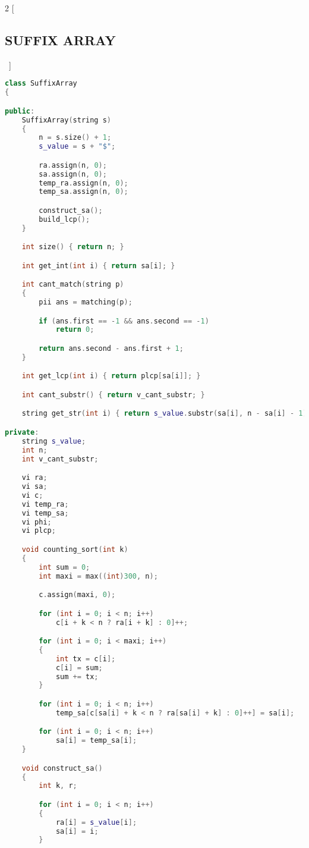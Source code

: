 \documentclass[leter]{amsart}
\begin{document}
\begin{multicols}{2}
[\subsection{SUFFIX ARRAY}\ ]
\begin{lstlisting}[language=C++]
class SuffixArray
{

public:
    SuffixArray(string s)
    {
        n = s.size() + 1;
        s_value = s + "$";

        ra.assign(n, 0);
        sa.assign(n, 0);
        temp_ra.assign(n, 0);
        temp_sa.assign(n, 0);

        construct_sa();
        build_lcp();
    }

    int size() { return n; }

    int get_int(int i) { return sa[i]; }

    int cant_match(string p)
    {
        pii ans = matching(p);

        if (ans.first == -1 && ans.second == -1)
            return 0;

        return ans.second - ans.first + 1;
    }

    int get_lcp(int i) { return plcp[sa[i]]; }

    int cant_substr() { return v_cant_substr; }

    string get_str(int i) { return s_value.substr(sa[i], n - sa[i] - 1); }

private:
    string s_value;
    int n;
    int v_cant_substr;

    vi ra;
    vi sa;
    vi c;
    vi temp_ra;
    vi temp_sa;
    vi phi;
    vi plcp;

    void counting_sort(int k)
    {
        int sum = 0;
        int maxi = max((int)300, n);

        c.assign(maxi, 0);

        for (int i = 0; i < n; i++)
            c[i + k < n ? ra[i + k] : 0]++;

        for (int i = 0; i < maxi; i++)
        {
            int tx = c[i];
            c[i] = sum;
            sum += tx;
        }

        for (int i = 0; i < n; i++)
            temp_sa[c[sa[i] + k < n ? ra[sa[i] + k] : 0]++] = sa[i];

        for (int i = 0; i < n; i++)
            sa[i] = temp_sa[i];
    }

    void construct_sa()
    {
        int k, r;

        for (int i = 0; i < n; i++)
        {
            ra[i] = s_value[i];
            sa[i] = i;
        }


\end{lstlisting}
\end{multicols}
\end{document}
